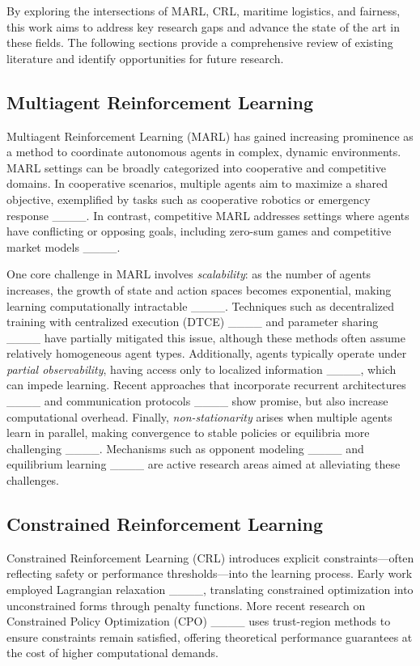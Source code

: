 By exploring the intersections of MARL, CRL, maritime logistics, and fairness, this work aims to address key research gaps and advance the state of the art in these fields. The following sections provide a comprehensive review of existing literature and identify opportunities for future research.

\subsection{Multiagent Reinforcement Learning}
Multiagent Reinforcement Learning (MARL) has gained increasing prominence as a method to coordinate autonomous agents in complex, dynamic environments. MARL settings can be broadly categorized into cooperative and competitive domains. In cooperative scenarios, multiple agents aim to maximize a shared objective, exemplified by tasks such as cooperative robotics or emergency response ____. In contrast, competitive MARL addresses settings where agents have conflicting or opposing goals, including zero-sum games and competitive market models ____.

One core challenge in MARL involves \emph{scalability}: as the number of agents increases, the growth of state and action spaces becomes exponential, making learning computationally intractable ____. Techniques such as decentralized training with centralized execution (DTCE) ____ and parameter sharing ____ have partially mitigated this issue, although these methods often assume relatively homogeneous agent types. Additionally, agents typically operate under \emph{partial observability}, having access only to localized information ____, which can impede learning. Recent approaches that incorporate recurrent architectures ____ and communication protocols ____ show promise, but also increase computational overhead. Finally, \emph{non-stationarity} arises when multiple agents learn in parallel, making convergence to stable policies or equilibria more challenging ____. Mechanisms such as opponent modeling ____ and equilibrium learning ____ are active research areas aimed at alleviating these challenges.

\subsection{Constrained Reinforcement Learning}
Constrained Reinforcement Learning (CRL) introduces explicit constraints—often reflecting safety or performance thresholds—into the learning process. Early work employed Lagrangian relaxation ____, translating constrained optimization into unconstrained forms through penalty functions. More recent research on Constrained Policy Optimization (CPO) ____ uses trust-region methods to ensure constraints remain satisfied, offering theoretical performance guarantees at the cost of higher computational demands.

